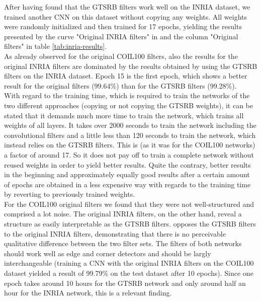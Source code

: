\documentclass[11pt, a4paper]{article}
\begin{document}
After having found that the GTSRB filters work well on the INRIA dataset, we trained another CNN on this dataset without copying any weights. All weights were randomly initialized and then trained for 17 epochs, yielding the results presented by the curve "Original INRIA filters" in  and the column "Original filters" in table \ref{tab:inria-results}.\\
As already observed for the original COIL100 filters, also the results for the original INRIA filters are dominated by the results obtained by using the GTSRB filters on the INRIA dataset. Epoch 15 is the first epoch, which shows a better result for the original filters (99.64\%) than for the GTSRB filters (99.28\%).\\
With regard to the training time, which is required to train the networks of the two different approaches (copying or not copying the GTSRB weights), it can be stated that it demands much more time to train the network, which trains all weights of all layers. It takes over 2000 seconds to train the network including the convolutional filters and a little less than 120 seconds to train the network, which instead relies on the GTSRB filters. This is (as it was for the COIL100 networks) a factor of around 17. So it does not pay off to train a complete network without reused weights in order to yield better results. Quite the contrary, better results in the beginning and approximately equally good results after a certain amount of epochs are obtained in a less expensive way with regards to the training time by reverting to previously trained weights.\\
For the COIL100 original filters we found that they were not well-structured and comprised a lot noise. The original INRIA filters, on the other hand, reveal a structure as easily interpretable as the GTSRB filters.  opposes the GTSRB filters to the original INRIA filters, demonstrating that there is no perceivable qualitative difference between the two filter sets. The filters of both networks should work well as edge and corner detectors and should be largly interchangeable (training a CNN with the original INRIA filters on the COIL100 dataset yielded a result of 99.79\% on the test dataset after 10 epochs). Since one epoch takes around 10 hours for the GTSRB network and only around half an hour for the INRIA network, this is a relevant finding.
\end{document}
